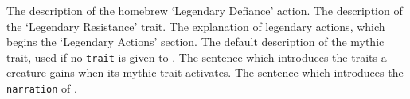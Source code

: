 			{
				The description of the homebrew `Legendary Defiance' action.
			}
			{
				The description of the `Legendary Resistance' trait.
			}
			{
				The explanation of legendary actions, which begins the `Legendary Actions' section.
			}
			{
				The default description of the mythic trait, used if no \texttt{trait} is given to .
			}
			{
				The sentence which introduces the traits a creature gains when its mythic trait activates.
			}
			{
				The sentence which introduces the \texttt{narration} of .
			}
